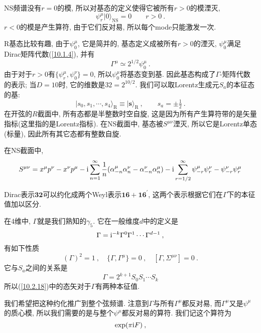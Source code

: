 NS频谱没有$ r=0 $的模, 所以对基态的定义使得它被所有$ r>0 $的模湮灭,
\begin{equation}
    \psi_{r}^{\mu}\lvert 0\rangle_{\text{NS}} =0 \qquad r>0 \:. \label{10.2.16}
\end{equation}
$r<0 $的模是产生算符, 由于它们反对易, 所以每个mode只能激发一次.

R基态比较有趣, 由于$ \psi_{0}^{\mu}$, 它是简并的, 基态定义成被所有$ r>0 $的湮灭, $\psi_{0}^{\mu} $满足Dirac矩阵代数(\ref{10.1.4}), 并有
\begin{equation}
    \Gamma^{\mu}\simeq 2^{1/2}\psi_{0}^{\mu} \:.\label{10.2.17}
\end{equation}
由于对于$ r>0 $有$ \{\psi_{r}^{\mu},\psi_{0}^{\nu}\}=0$, 所以$\psi_{0}^{\mu}$将基态变到基. 因此基态构成了$ \Gamma $-矩阵代数的表示; 当$ D=10 $时, 它的维数是$ 32=2^{10/2}$. 我们可以取Lorentz生成元$S_{a}$的本征态的基:
\begin{equation}
    \lvert s_{0},s_{1},\cdots ,s_{4}\rangle_{\text{R}}\equiv \lvert\mathbf{s}\rangle_{\text{R}}\:, 
     \qquad s_{a}=\pm\tfrac{1}{2} \:. \label{10.2.18}
\end{equation}
在开弦的$R$截面中, 所有态都是半整数时空自旋, 这是因为所有产生算符带的是矢量指标(这里指的是Lorentz指标). 在NS截面中, 基态被$S^{\mu\nu}$湮灭, 所以它是Lorentz单态(标量), 因此所有其它态都有整数自旋.
\begin{tcolorbox}
在NS截面中, 
\[
S^{\mu\nu}=x^{\mu}p^{\nu}-x^{\nu}p^{\mu} -\mathrm{i} \sum_{n=1}^{\infty}\frac{1}{n}(\alpha_{-n}^{\mu}\alpha_{n}^{\nu}-\alpha^{\nu}_{-n}\alpha_{n}^{\mu})
-\mathrm{i}\sum_{r=1/2}^{\infty}\psi_{-r}^{\mu}\psi_{r}^{\nu}- \psi_{-r}^{\nu}\psi_{r}^{\mu}
\]
\end{tcolorbox}
Dirac表示$ \mathbf{32} $可以约化成两个Weyl表示$ \mathbf{16}+\mathbf{16}^{\prime}$, 这两个表示根据它们在$\Gamma$下的本征值加以区分.
\begin{tcolorbox}
在4维中, $\Gamma$就是我们熟知的$\gamma_{5}$. 它在一般维度$ d $中的定义是
\[
\Gamma=\mathrm{i}^{-k}\Gamma^{0}\Gamma^{1}\cdots\Gamma^{d-1}\:, 
\]
有如下性质
\[
(\Gamma)^{2}=1 \:, \quad \{\Gamma,\Gamma^{\mu}\}=0\:,\quad [\Gamma,\Sigma^{\mu\nu}]=0 \:.
\]
它与$ S_{a} $之间的关系是
\[
\Gamma= 2^{k+1}S_{0}S_{1}\cdots S_{k}
\]
所以(\ref{10.2.18})中的态矢对于$\Gamma$有两种本征值.
\end{tcolorbox}
我们希望把这种约化推广到整个弦频谱. 注意到$ \Gamma $与所有$ \Gamma^{\mu} $都反对易, 而$ \Gamma^{\mu} $又是$ \psi^{\mu} $的质心模, 所以我们需要的是与整个$ \psi^{\mu} $都反对易的算符. 我们记这个算符为
\begin{equation}
    \exp(\pi\mathrm{i} F) \:, \label{10.2.19}
\end{equation}
